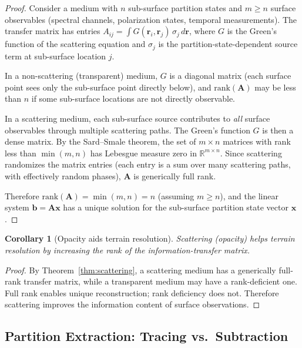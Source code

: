 \documentclass[10pt,twocolumn]{article}
\newtheorem{corollary}[theorem]{Corollary}
\theoremstyle{definition}
\theoremstyle{remark}
\newcommand{\R}{\mathbb{R}}
\begin{document}
\begin{proof}
Consider a medium with $n$ sub-surface partition states and
$m\ge n$ surface observables (spectral channels, polarization
states, temporal measurements).  The transfer matrix has entries
$A_{ij}=\int G(\mathbf{r}_i,\mathbf{r}_j)\,\sigma_j\,d\mathbf{r}$,
where $G$ is the Green's function of the scattering equation
and $\sigma_j$ is the partition-state-dependent source term at
sub-surface location $j$.

In a non-scattering (transparent) medium, $G$ is a diagonal
matrix (each surface point sees only the sub-surface point
directly below), and $\mathrm{rank}(\mathbf{A})$ may be less
than $n$ if some sub-surface locations are not directly
observable.

In a scattering medium, each sub-surface source contributes to
\emph{all} surface observables through multiple scattering
paths.  The Green's function $G$ is then a dense matrix.  By
the Sard--Smale theorem, the set of $m\times n$ matrices with
rank less than $\min(m,n)$ has Lebesgue measure zero in
$\R^{m\times n}$.  Since scattering randomizes the matrix
entries (each entry is a sum over many scattering paths, with
effectively random phases), $\mathbf{A}$ is generically full
rank.

Therefore $\mathrm{rank}(\mathbf{A})=\min(m,n)=n$ (assuming
$m\ge n$), and the linear system $\mathbf{b}=\mathbf{A}\mathbf{x}$
has a unique solution for the sub-surface partition state
vector $\mathbf{x}$.
\end{proof}

\begin{corollary}[Opacity aids terrain resolution]
\label{cor:aids}
Scattering (opacity) \emph{helps} terrain resolution by
increasing the rank of the information-transfer matrix.
\end{corollary}

\begin{proof}
By Theorem~\ref{thm:scattering}, a scattering medium has a
generically full-rank transfer matrix, while a transparent
medium may have a rank-deficient one.  Full rank enables unique
reconstruction; rank deficiency does not.  Therefore scattering
improves the information content of surface observations.
\end{proof}

\subsection{Partition Extraction: Tracing vs.\ Subtraction}
\label{sec:extraction}
\end{document}
